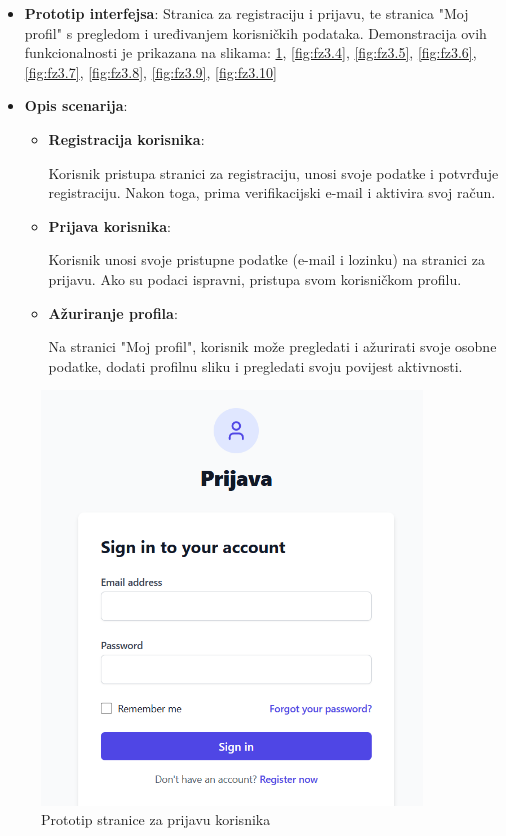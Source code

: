 \begin{itemize}
    \item \textbf{Prototip interfejsa}: Stranica za registraciju i prijavu, te stranica "Moj profil" s pregledom i uređivanjem korisničkih podataka. Demonstracija ovih funkcionalnosti je prikazana na slikama: \ref{fig:fz3.3}, \ref{fig:fz3.4}, \ref{fig:fz3.5}, \ref{fig:fz3.6}, \ref{fig:fz3.7}, \ref{fig:fz3.8}, \ref{fig:fz3.9}, \ref{fig:fz3.10}
    \item \textbf{Opis scenarija}:
    \begin{itemize}
        \item \textbf{Registracija korisnika}: 

        
        Korisnik pristupa stranici za registraciju, unosi svoje podatke i potvrđuje registraciju. Nakon toga, prima verifikacijski e-mail i aktivira svoj račun.
        
        \item \textbf{Prijava korisnika}: 

        
        Korisnik unosi svoje pristupne podatke (e-mail i lozinku) na stranici za prijavu. Ako su podaci ispravni, pristupa svom korisničkom profilu.
        
        \item \textbf{Ažuriranje profila}: 

        
        Na stranici "Moj profil", korisnik može pregledati i ažurirati svoje osobne podatke, dodati profilnu sliku i pregledati svoju povijest aktivnosti.
    \end{itemize}
\end{itemize}

\begin{figure}[H]
    \centering
    \includegraphics[width=0.9\textwidth]{Slike/fz3.3.png}
    \caption{Prototip stranice za prijavu korisnika}
    \label{fig:fz3.3}
\end{figure}

